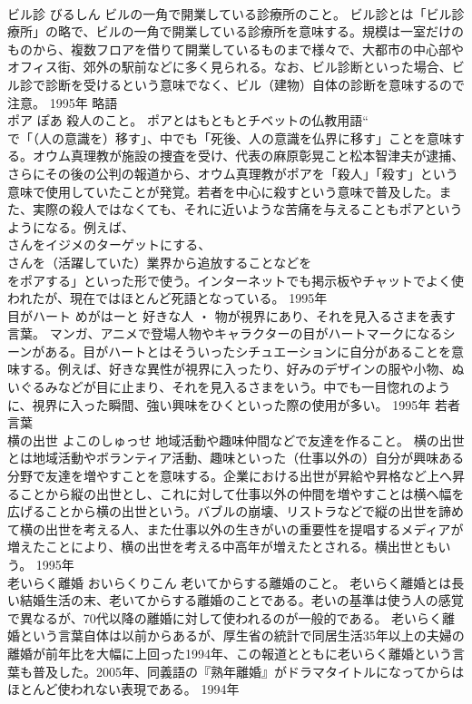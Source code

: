 \documentclass[8pt]{extreport}
\begin{document}
\begin{CJK}{UTF8}{min}
\\	ビル診	びるしん	ビルの一角で開業している診療所のこと。	ビル診とは「ビル診療所」の略で、ビルの一角で開業している診療所を意味する。規模は一室だけのものから、複数フロアを借りて開業しているものまで様々で、大都市の中心部やオフィス街、郊外の駅前などに多く見られる。なお、ビル診断といった場合、ビル診で診断を受けるという意味でなく、ビル（建物）自体の診断を意味するので注意。	1995年	略語	
\\	ポア	ぽあ	殺人のこと。	ポアとはもともとチベットの仏教用語“
\\	で「（人の意識を）移す」、中でも「死後、人の意識を仏界に移す」ことを意味する。オウム真理教が施設の捜査を受け、代表の麻原彰晃こと松本智津夫が逮捕、さらにその後の公判の報道から、オウム真理教がポアを「殺人」「殺す」という意味で使用していたことが発覚。若者を中心に殺すという意味で普及した。また、実際の殺人ではなくても、それに近いような苦痛を与えることもポアというようになる。例えば、
\\	さんをイジメのターゲットにする、
\\	さんを（活躍していた）業界から追放することなどを
\\	をポアする」といった形で使う。インターネットでも掲示板やチャットでよく使われたが、現在ではほとんど死語となっている。	1995年	
\\	目がハート	めがはーと	好きな人 ・ 物が視界にあり、それを見入るさまを表す言葉。	マンガ、アニメで登場人物やキャラクターの目がハートマークになるシーンがある。目がハートとはそういったシチュエーションに自分があることを意味する。例えば、好きな異性が視界に入ったり、好みのデザインの服や小物、ぬいぐるみなどが目に止まり、それを見入るさまをいう。中でも一目惚れのように、視界に入った瞬間、強い興味をひくといった際の使用が多い。	1995年	若者言葉	
\\	横の出世	よこのしゅっせ	地域活動や趣味仲間などで友達を作ること。	横の出世とは地域活動やボランティア活動、趣味といった（仕事以外の）自分が興味ある分野で友達を増やすことを意味する。企業における出世が昇給や昇格など上へ昇ることから縦の出世とし、これに対して仕事以外の仲間を増やすことは横へ幅を広げることから横の出世という。バブルの崩壊、リストラなどで縦の出世を諦めて横の出世を考える人、また仕事以外の生きがいの重要性を提唱するメディアが増えたことにより、横の出世を考える中高年が増えたとされる。横出世ともいう。	1995年	
\\	老いらく離婚	おいらくりこん	老いてからする離婚のこと。	老いらく離婚とは長い結婚生活の末、老いてからする離婚のことである。老いの基準は使う人の感覚で異なるが、70代以降の離婚に対して使われるのが一般的である。 老いらく離婚という言葉自体は以前からあるが、厚生省の統計で同居生活35年以上の夫婦の離婚が前年比を大幅に上回った1994年、この報道とともに老いらく離婚という言葉も普及した。2005年、同義語の『熟年離婚』がドラマタイトルになってからはほとんど使われない表現である。	1994年	

\end{CJK}
\end{document}
